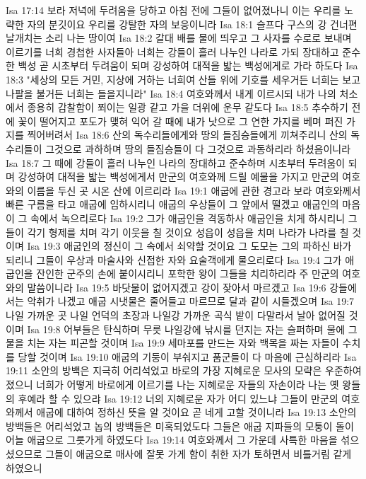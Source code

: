 Isa 17:14  보라 저녁에 두려움을 당하고 아침 전에 그들이 없어졌나니 이는 우리를 노략한 자의 분깃이요 우리를 강탈한 자의 보응이니라
Isa 18:1  슬프다 구스의 강 건너편 날개치는 소리 나는 땅이여
Isa 18:2  갈대 배를 물에 띄우고 그 사자를 수로로 보내며 이르기를 너희 경첩한 사자들아 너희는 강들이 흘러 나누인 나라로 가되 장대하고 준수한 백성 곧 시초부터 두려움이 되며 강성하여 대적을 밟는 백성에게로 가라 하도다
Isa 18:3  "세상의 모든 거민, 지상에 거하는 너희여 산들 위에 기호를 세우거든 너희는 보고 나팔을 불거든 너희는 들을지니라"
Isa 18:4  여호와께서 내게 이르시되 내가 나의 처소에서 종용히 감찰함이 쬐이는 일광 같고 가을 더위에 운무 같도다
Isa 18:5  추수하기 전에 꽃이 떨어지고 포도가 맺혀 익어 갈 때에 내가 낫으로 그 연한 가지를 베며 퍼진 가지를 찍어버려서
Isa 18:6  산의 독수리들에게와 땅의 들짐승들에게 끼쳐주리니 산의 독수리들이 그것으로 과하하며 땅의 들짐승들이 다 그것으로 과동하리라 하셨음이니라
Isa 18:7  그 때에 강들이 흘러 나누인 나라의 장대하고 준수하며 시초부터 두려움이 되며 강성하여 대적을 밟는 백성에게서 만군의 여호와께 드릴 예물을 가지고 만군의 여호와의 이름을 두신 곳 시온 산에 이르리라
Isa 19:1  애굽에 관한 경고라 보라 여호와께서 빠른 구름을 타고 애굽에 임하시리니 애굽의 우상들이 그 앞에서 떨겠고 애굽인의 마음이 그 속에서 녹으리로다
Isa 19:2  그가 애굽인을 격동하사 애굽인을 치게 하시리니 그들이 각기 형제를 치며 각기 이웃을 칠 것이요 성읍이 성읍을 치며 나라가 나라를 칠 것이며
Isa 19:3  애굽인의 정신이 그 속에서 쇠약할 것이요 그 도모는 그의 파하신 바가 되리니 그들이 우상과 마술사와 신접한 자와 요술객에게 물으리로다
Isa 19:4  그가 애굽인을 잔인한 군주의 손에 붙이시리니 포학한 왕이 그들을 치리하리라 주 만군의 여호와의 말씀이니라
Isa 19:5  바닷물이 없어지겠고 강이 잦아서 마르겠고
Isa 19:6  강들에서는 악취가 나겠고 애굽 시냇물은 줄어들고 마르므로 달과 같이 시들겠으며
Isa 19:7  나일 가까운 곳 나일 언덕의 초장과 나일강 가까운 곡식 밭이 다말라서 날아 없어질 것이며
Isa 19:8  어부들은 탄식하며 무릇 나일강에 낚시를 던지는 자는 슬퍼하며 물에 그물을 치는 자는 피곤할 것이며
Isa 19:9  세마포를 만드는 자와 백목을 짜는 자들이 수치를 당할 것이며
Isa 19:10  애굽의 기둥이 부숴지고 품군들이 다 마음에 근심하리라
Isa 19:11  소안의 방백은 지극히 어리석었고 바로의 가장 지혜로운 모사의 모략은 우준하여졌으니 너희가 어떻게 바로에게 이르기를 나는 지혜로운 자들의 자손이라 나는 옛 왕들의 후예라 할 수 있으랴
Isa 19:12  너의 지혜로운 자가 어디 있느냐 그들이 만군의 여호와께서 애굽에 대하여 정하신 뜻을 알 것이요 곧 네게 고할 것이니라
Isa 19:13  소안의 방백들은 어리석었고 놉의 방백들은 미혹되었도다 그들은 애굽 지파들의 모퉁이 돌이어늘 애굽으로 그릇가게 하였도다
Isa 19:14  여호와께서 그 가운데 사특한 마음을 섞으셨으므로 그들이 애굽으로 매사에 잘못 가게 함이 취한 자가 토하면서 비틀거림 같게 하였으니
